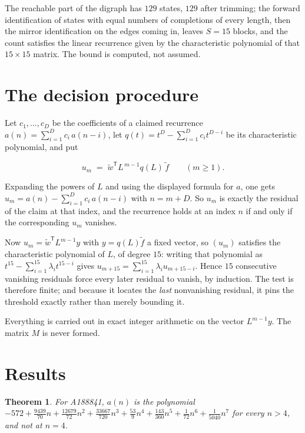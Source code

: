 \documentclass[11pt]{article}
\newtheorem{theorem}{Theorem}
\theoremstyle{definition}
\begin{document}
The reachable part of the digraph has $129$ states, $129$ after trimming; the forward identification of states with equal numbers of completions of every length, then the mirror identification on the edges coming in, leaves $S = 15$ blocks, and the count satisfies the linear recurrence given by the characteristic polynomial of that $15\times15$ matrix. The bound is computed, not assumed.

\section{The decision procedure}

Let $c_1,\dots,c_D$ be the coefficients of a claimed recurrence $a(n) = \sum_{i=1}^{D} c_i\,a(n-i)$, let $q(t) = t^{D} - \sum_{i=1}^{D} c_i t^{D-i}$ be its characteristic polynomial, and put

\[u_m \;=\; \tilde w^{\mathsf T} L^{\,m-1} q(L)\,\tilde f \qquad (m \ge 1).\]

Expanding the powers of $L$ and using the displayed formula for $a$, one gets $u_m = a(n) - \sum_{i=1}^{D} c_i\,a(n-i)$ with $n = m + D$. So $u_m$ is exactly the residual of the claim at that index, and the recurrence holds at an index $n$ if and only if the corresponding $u_m$ vanishes.

Now $u_m = \tilde w^{\mathsf T} L^{m-1} y$ with $y = q(L)\tilde f$ a fixed vector, so $(u_m)$ satisfies the characteristic polynomial of $L$, of degree $15$: writing that polynomial as $t^{15} - \sum_{i=1}^{15} \lambda_i t^{15-i}$ gives $u_{m+15} = \sum_{i=1}^{15} \lambda_i u_{m+15-i}$. Hence $15$ consecutive vanishing residuals force every later residual to vanish, by induction. The test is therefore finite; and because it locates the {\itshape last} nonvanishing residual, it pins the threshold exactly rather than merely bounding it.

Everything is carried out in exact integer arithmetic on the vector $L^{m-1}y$. The matrix $M$ is never formed.

\section{Results}

\begin{theorem} For A188841, $a(n)$ is the polynomial $-572 + \frac{9439}{70}n + \frac{12679}{72}n^{2} + \frac{33667}{720}n^{3} + \frac{53}{9}n^{4} + \frac{143}{360}n^{5} + \frac{1}{72}n^{6} + \frac{1}{5040}n^{7}$ for every $n > 4$, and not at $n = 4$.\end{theorem}
\end{document}

